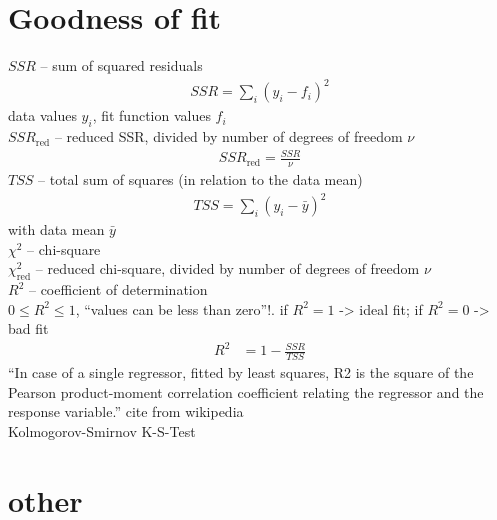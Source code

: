 

\section{Goodness of fit}
\label{sec:goodness_of_fit}

$SSR$ -- sum of squared residuals\\
\begin{align}
	SSR = \sum_i (y_i - f_i)^2
\end{align}
data values $y_i$, fit function values $f_i$\\
$SSR_\text{red}$ -- reduced SSR, divided by number of degrees of freedom $\nu$\\
\begin{align}
	SSR_\text{red} = \frac{SSR}{\nu}
\end{align}
$TSS$ -- total sum of squares (in relation to the data mean)\\
\begin{align}
	TSS = \sum_i (y_i - \bar{y})^2
\end{align}
with data mean $\bar{y}$\\

$\chi^2$ -- chi-square\\
$\chi^2_\text{red}$ -- reduced chi-square, divided by number of degrees of freedom $\nu$\\

$R^2$ -- coefficient of determination\\
$0 \leq R^2 \leq 1$, ``values can be less than zero''!. if $R^2 = 1$ -> ideal fit; if $R^2 = 0$ -> bad fit
\begin{align}
	R^2 &= 1 - \frac{SSR}{TSS}
\end{align}
``In case of a single regressor, fitted by least squares, R2 is the square of the Pearson product-moment correlation coefficient relating the regressor and the response variable.'' cite from wikipedia \\%

Kolmogorov-Smirnov K-S-Test


\section{other}

